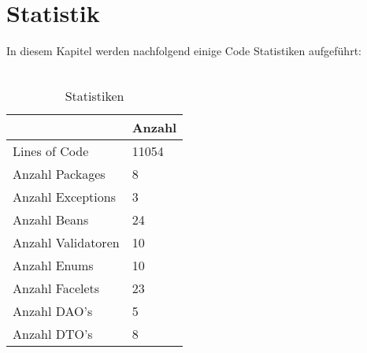 \chapter{Statistik}

In diesem Kapitel werden nachfolgend einige Code Statistiken aufgeführt:\ \\
\ \\
\begin{table}[h]
	\begin{center}
		\begin{tabular}{|p{6cm}|p{6cm}|}
			\hline \textbf{} & \textbf{Anzahl}  \\ 
			\hline Lines of Code &  11054 \\ 
			\hline Anzahl Packages & 8  \\ 
			\hline Anzahl Exceptions & 3 \\ 
			\hline Anzahl Beans &  24 \\ 
			\hline Anzahl Validatoren & 10\\ 
			\hline Anzahl Enums & 10\\
			\hline Anzahl Facelets & 23\\
			\hline Anzahl DAO's & 5\\
			\hline Anzahl DTO's & 8\\
			\hline 
		\end{tabular} 
		\caption{Statistiken}
		\label{fig:Statistiken}
	\end{center}
\end{table}